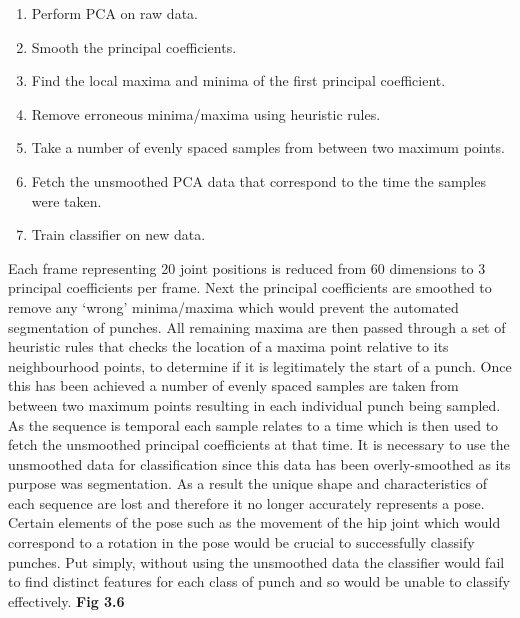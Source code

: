 \begin{enumerate}[noitemsep]
  \item Perform PCA on raw data.
  \item Smooth the principal coefficients.
  \item Find the local maxima and minima of the first principal coefficient.
  \item Remove erroneous minima/maxima using heuristic rules.
  \item Take a number of evenly spaced samples from between two maximum points.
  \item Fetch the unsmoothed PCA data that correspond to the time the samples were taken.
  \item Train classifier on new data.
\end{enumerate}
Each frame representing 20 joint positions is reduced from 60 dimensions to 3 principal coefficients per frame. Next the principal coefficients are smoothed to remove any `wrong' minima/maxima which would prevent the automated segmentation of punches. All remaining maxima are then passed through a set of heuristic rules that checks the location of a maxima point relative to its neighbourhood points, to determine if it is legitimately the start of a punch. Once this has been achieved a number of evenly spaced samples are taken from between two maximum points resulting in each individual punch being sampled. As the sequence is temporal each sample relates to a time which is then used to fetch the unsmoothed principal coefficients at that time. It is necessary to use the unsmoothed data for classification since this data has been overly-smoothed as its purpose was segmentation. As a result the unique shape and characteristics of each sequence are lost and therefore it no longer accurately represents a pose. Certain elements of the pose such as the movement of the hip joint which would correspond to a rotation in the pose would be crucial to successfully classify punches. Put simply, without using the unsmoothed data the classifier would fail to find distinct features for each class of punch and so would be unable to classify effectively. {\bf Fig 3.6}


